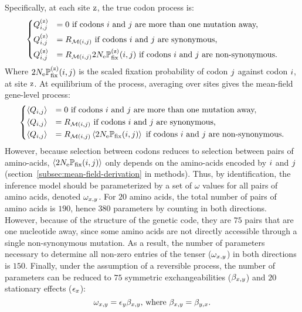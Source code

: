 Specifically, at each site $\text{z}$, the true codon process is:
\begin{equation}
    \begin{dcases}
        Q_{{i}, {j}}^{(\text{z})} & = 0 \text{ if codons ${i}$ and ${j}$ are more than one mutation away,} \\
        Q_{{i}, {j}}^{(\text{z})} & = R_{\mathcal{M}({i}, {j})} \text{ if codons ${i}$ and ${j}$ are synonymous,} \\
        Q_{{i}, {j}}^{(\text{z})} & = R_{\mathcal{M}({i}, {j})} 2 N_{\text{e}} \mathbb{P}_{\text{fix}}^{(\text{z})}({i}, {j}) \text{ if codons ${i}$ and ${j}$ are non-synonymous}.
    \end{dcases}
    \label{eq:codon-site-processs}
\end{equation}
Where $2 N_{\text{e}} \mathbb{P}_{\text{fix}}^{(\text{z})}({i}, {j})$ is the scaled fixation probability of codon ${j}$ against codon ${i}$, at site $\text{z}$.
At equilibrium of the process, averaging over sites gives the mean-field gene-level process:
\begin{equation}
    \begin{dcases}
        \left\langle Q_{{i}, {j}} \right\rangle & = 0 \text{ if codons ${i}$ and ${j}$ are more than one mutation away,} \\
        \left\langle Q_{{i}, {j}} \right\rangle & = R_{\mathcal{M}({i}, {j})} \text{ if codons ${i}$ and ${j}$ are synonymous,} \\
        \left\langle Q_{{i}, {j}} \right\rangle & = R_{\mathcal{M}({i}, {j})} \left\langle 2 N_{\text{e}} \mathbb{P}_{\text{fix}} ({i}, {j}) \right\rangle \text{ if codons ${i}$ and ${j}$ are non-synonymous}.
    \end{dcases}
    \label{eq:codon-avg-process}
\end{equation}
However, because selection between codons reduces to selection between pairs of amino-acids, $\left\langle 2 N_{\text{e}} \mathbb{P}_{\text{fix}} ({i}, {j}) \right\rangle$ only depends on the amino-acids encoded by ${i}$ and ${j}$ (section~\ref{subsec:mean-field-derivation} in methods).
Thus, by identification, the inference model should be parameterized by a set of $\omega$ values for all pairs of amino acids, denoted $\omega_{x, y}$.
For $20$ amino acids, the total number of pairs of amino acids is $190$, hence $380$ parameters by counting in both directions.
However, because of the structure of the genetic code, they are $75$ pairs that are one nucleotide away, since some amino acids are not directly accessible through a single non-synonymous mutation.
As a result, the number of parameters necessary to determine all non-zero entries of the tenser ($\omega_{x, y}$) in both directions is $150$.
Finally, under the assumption of a reversible process, the number of parameters can be reduced to $75$ symmetric exchangeabilities ($\beta_{x, y}$) and $20$ stationary effects ($\epsilon_{x}$):
\begin{equation}
    \omega_{x, y} = \epsilon_{y} \beta_{x, y}\text{, where } \beta_{x, y} = \beta_{y, x}.\label{eq:omega-reversible}
\end{equation}

